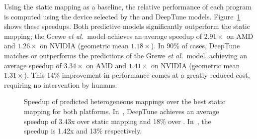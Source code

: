 Using the static mapping as a baseline, the relative performance of each program is computed using the device selected by the \citeauthor{Grewe2013} and DeepTune models. Figure~\ref{fig:cgo-speedup} shows these speedups. Both predictive models significantly outperform the static mapping; the Grewe \emph{et al.\ }model achieves an average speedup of $2.91\times$ on AMD and $1.26\times$ on NVIDIA (geometric mean $1.18\times$). In 90\% of cases, DeepTune matches or outperforms the predictions of the Grewe \emph{et al.\ }model, achieving an average speedup of $3.34\times$ on AMD and $1.41\times$ on NVIDIA (geometric mean $1.31\times$). This 14\% improvement in performance comes at a greatly reduced cost, requiring no intervention by humans.

\begin{figure}
  \centering %
  \caption[Speedup of predicted heterogeneous mappings]{%
    Speedup of predicted heterogeneous mappings over the best static mapping for both platforms. In~, DeepTune achieves an average speedup of 3.43x over static mapping and 18\% over \citeauthor{Grewe2013}. In~, the speedup is 1.42x and 13\% respectively.%
  }
  \label{fig:cgo-speedup}
\end{figure}
